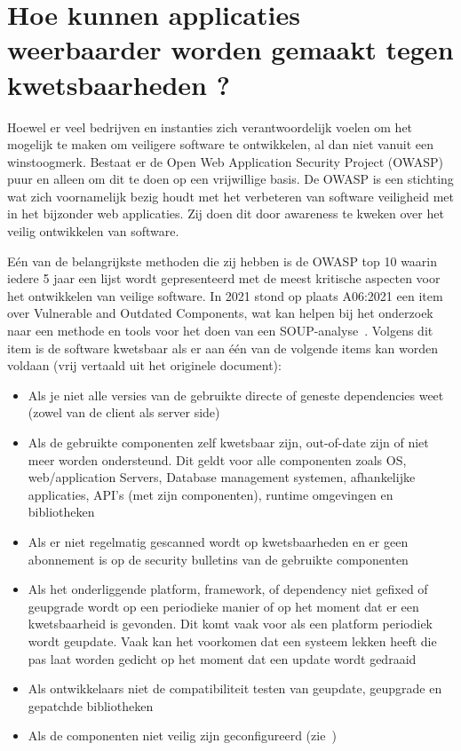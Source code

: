 \section{Hoe kunnen applicaties weerbaarder worden gemaakt tegen kwetsbaarheden ?}\label{sec:hoe-kan-er-voorkomen-worden-dat-er-kwetsbaarheden-ontstaan-in-een-applicatie-die-gebruik-maakt-van-externe-bibliotheken?}

Hoewel er veel bedrijven en instanties zich verantwoordelijk voelen om het mogelijk te maken om veiligere software te ontwikkelen, al dan niet vanuit een winstoogmerk. Bestaat er de Open Web Application Security Project (OWASP) puur en alleen om dit te doen op een vrijwillige basis. De OWASP is een stichting wat zich voornamelijk bezig houdt met het verbeteren van software veiligheid met in het bijzonder web applicaties. Zij doen dit door awareness te kweken over het veilig ontwikkelen van software.

Eén van de belangrijkste methoden die zij hebben is de OWASP top 10 waarin iedere 5 jaar een lijst wordt gepresenteerd met de meest kritische aspecten voor het ontwikkelen van veilige software. In 2021 stond op plaats A06:2021 een item over Vulnerable and Outdated Components, wat kan helpen bij het onderzoek naar een methode en tools voor het doen van een SOUP-analyse~\citep{OWASP:2021}.
Volgens dit item is de software kwetsbaar als er aan één van de volgende items kan worden voldaan (vrij vertaald uit het originele document):
\begin{itemize}
    \item Als je niet alle versies van de gebruikte directe of geneste dependencies weet (zowel van de client als server side)
    \item Als de gebruikte componenten zelf kwetsbaar zijn, out-of-date zijn of niet meer worden ondersteund. Dit geldt voor alle componenten zoals OS, web/application Servers, Database management systemen, afhankelijke applicaties, API's (met zijn componenten), runtime omgevingen en bibliotheken
    \item Als er niet regelmatig gescanned wordt op kwetsbaarheden en er geen abonnement is op de security bulletins van de gebruikte componenten
    \item Als het onderliggende platform, framework, of dependency niet gefixed of geupgrade wordt op een periodieke manier of op het moment dat er een kwetsbaarheid is gevonden. Dit komt vaak voor als een platform periodiek wordt geupdate. Vaak kan het voorkomen dat een systeem lekken heeft die pas laat worden gedicht op het moment dat een update wordt gedraaid
    \item Als ontwikkelaars niet de compatibiliteit testen van geupdate, geupgrade en gepatchde bibliotheken
    \item Als de componenten niet veilig zijn geconfigureerd (zie~\citep{OWASP:2021})
\end{itemize}

